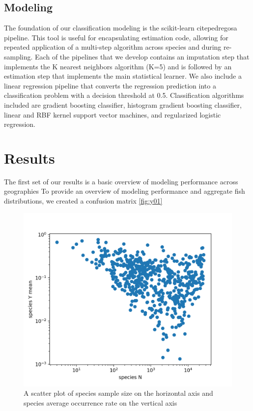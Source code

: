 \documentclass[]{article}
\begin{document}
\subsection{Modeling}
The foundation of our classification modeling is the scikit-learn cite{pedregosa} pipeline. This tool is useful for encapsulating estimation code, allowing for repeated application of a multi-step algorithm across species and during re-sampling. Each of the pipelines that we develop contains an imputation step that implements the K nearest neighbors algorithm (K=5) and is followed by an estimation step that implements the main statistical learner. We also include a linear regression pipeline that converts the regression prediction into a classification problem with a decision threshold at 0.5. Classification algorithms included are gradient boosting classifier, histogram gradient boosting classifier, linear and RBF kernel support vector machines, and regularized logistic regression.


\section{Results}
The first set of our results is a basic overview of modeling performance across geographies
To provide an overview of modeling performance and aggregate fish distributions, we created a confusion matrix \ref{fig:y01}


\begin{figure}
	\includegraphics[width=\linewidth]{xy_scatter_log.png}
	\caption{A scatter plot of species sample size on the horizontal axis and species average occurrence rate on the vertical axis}
	\label{fig:scatter_n_y}
\end{figure}
\end{document}
